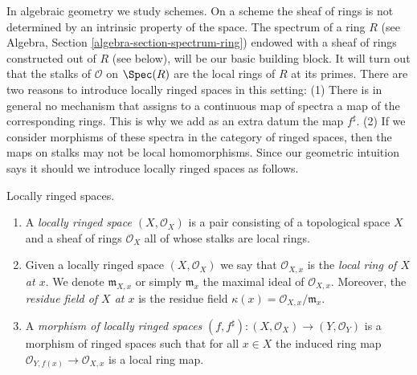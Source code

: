 \medskip\noindent
In algebraic geometry we study schemes. On a scheme the sheaf of rings
is not determined by an intrinsic property of the space.
The spectrum of a ring $R$
(see Algebra, Section \ref{algebra-section-spectrum-ring}) endowed
with a sheaf of rings constructed out of $R$ (see below),
will be our basic building block. It will turn out that
the stalks of $\mathcal{O}$ on $\Spec(R)$ are the local
rings of $R$ at its primes. There are two reasons to introduce
locally ringed spaces in this setting: (1) There is in general
no mechanism that assigns to a continuous map of spectra a
map of the corresponding rings. This is why we add as an extra datum
the map $f^\sharp$. (2) If we consider morphisms
of these spectra in the category of ringed spaces, then the
maps on stalks may not be local homomorphisms. Since our
geometric intuition says it should we introduce locally ringed spaces
as follows.

\begin{definition}
\label{definition-locally-ringed-space}
\begin{reference}
\cite[Chapter II, \S 1, nos. 32 and 35, pp. 225 and 228]{FAC}
\end{reference}
Locally ringed spaces.
\begin{enumerate}
\item A {\it locally ringed space $(X, \mathcal{O}_X)$}
is a pair consisting of a
topological space $X$ and a sheaf of rings $\mathcal{O}_X$ all of whose stalks
are local rings.
\item Given a locally ringed space $(X, \mathcal{O}_X)$ we say that
$\mathcal{O}_{X, x}$ is the {\it local ring of $X$ at $x$}.
We denote $\mathfrak{m}_{X, x}$ or simply $\mathfrak{m}_x$
the maximal ideal of $\mathcal{O}_{X, x}$. Moreover, the
{\it residue field of $X$ at $x$} is the residue field
$\kappa(x) = \mathcal{O}_{X, x}/\mathfrak{m}_x$.
\item A {\it morphism of locally ringed spaces}
$(f, f^\sharp) : (X, \mathcal{O}_X) \to (Y, \mathcal{O}_Y)$
is a morphism of ringed spaces such that for all $x \in X$
the induced ring map $\mathcal{O}_{Y, f(x)} \to \mathcal{O}_{X, x}$ is a
local ring map.
\end{enumerate}
\end{definition}

